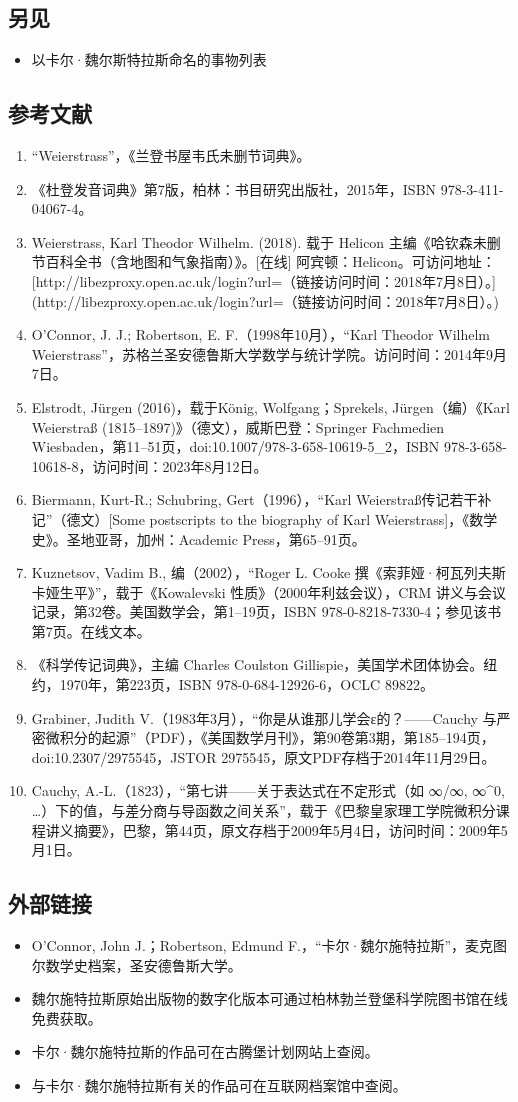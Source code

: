 \subsection{另见}
\begin{itemize}
\item 以卡尔·魏尔斯特拉斯命名的事物列表
\end{itemize}
\subsection{参考文献}
\begin{enumerate}
\item “Weierstrass”，《兰登书屋韦氏未删节词典》。
\item 《杜登发音词典》第7版，柏林：书目研究出版社，2015年，ISBN 978-3-411-04067-4。
\item Weierstrass, Karl Theodor Wilhelm. (2018). 载于 Helicon 主编《哈钦森未删节百科全书（含地图和气象指南）》。[在线] 阿宾顿：Helicon。可访问地址：[http://libezproxy.open.ac.uk/login?url=（链接访问时间：2018年7月8日）。](http://libezproxy.open.ac.uk/login?url=（链接访问时间：2018年7月8日）。)
\item O'Connor, J. J.; Robertson, E. F.（1998年10月），“Karl Theodor Wilhelm Weierstrass”，苏格兰圣安德鲁斯大学数学与统计学院。访问时间：2014年9月7日。
\item Elstrodt, Jürgen (2016)，载于König, Wolfgang；Sprekels, Jürgen（编）《Karl Weierstraß (1815–1897)》（德文），威斯巴登：Springer Fachmedien Wiesbaden，第11–51页，doi:10.1007/978-3-658-10619-5\_2，ISBN 978-3-658-10618-8，访问时间：2023年8月12日。
\item Biermann, Kurt-R.; Schubring, Gert（1996），“Karl Weierstraß传记若干补记”（德文）[Some postscripts to the biography of Karl Weierstrass]，《数学史》。圣地亚哥，加州：Academic Press，第65–91页。
\item Kuznetsov, Vadim B., 编（2002），“Roger L. Cooke 撰《索菲娅·柯瓦列夫斯卡娅生平》”，载于《Kowalevski 性质》（2000年利兹会议），CRM 讲义与会议记录，第32卷。美国数学会，第1–19页，ISBN 978-0-8218-7330-4；参见该书第7页。在线文本。
\item 《科学传记词典》，主编 Charles Coulston Gillispie，美国学术团体协会。纽约，1970年，第223页，ISBN 978-0-684-12926-6，OCLC 89822。
\item Grabiner, Judith V.（1983年3月），“你是从谁那儿学会ε的？——Cauchy 与严密微积分的起源”（PDF），《美国数学月刊》，第90卷第3期，第185–194页，doi:10.2307/2975545，JSTOR 2975545，原文PDF存档于2014年11月29日。
\item Cauchy, A.-L.（1823），“第七讲——关于表达式在不定形式（如 ∞/∞, ∞^0, …）下的值，与差分商与导函数之间关系”，载于《巴黎皇家理工学院微积分课程讲义摘要》，巴黎，第44页，原文存档于2009年5月4日，访问时间：2009年5月1日。
\end{enumerate}
\subsection{外部链接}
\begin{itemize}
\item O'Connor, John J.；Robertson, Edmund F.，“卡尔·魏尔施特拉斯”，麦克图尔数学史档案，圣安德鲁斯大学。
\item 魏尔施特拉斯原始出版物的数字化版本可通过柏林勃兰登堡科学院图书馆在线免费获取。
\item 卡尔·魏尔施特拉斯的作品可在古腾堡计划网站上查阅。
\item 与卡尔·魏尔施特拉斯有关的作品可在互联网档案馆中查阅。
\end{itemize}